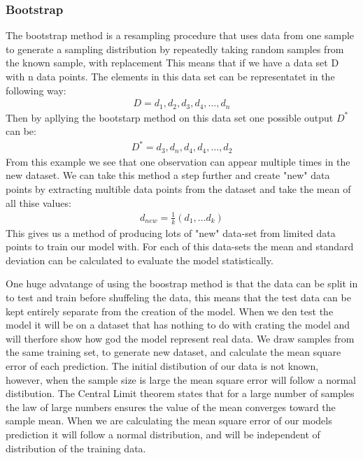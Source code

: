 \subsubsection{Bootstrap} 
\noindent The bootstrap method is a resampling procedure that uses data from one 
sample to generate a sampling distribution by repeatedly taking random 
samples from the known sample, with replacement %
This means that if we have a data set D with n data points.
The elements in this data set can be representatet in the following way:
\begin{align}
    D = {d_1, d_2, d_3, d_4, \dots, d_n}
\end{align}
Then by apllying the bootstarp method on this data set one possible output $D^{*}$ can be:
\begin{align}
    D^{*} = {d_3, d_n, d_4, d_4 , \dots, d_2}
\end{align}
From this example we see that one observation can appear multiple times in the new dataset.
We can take this method a step further and create "new" data points by extracting multible data points from 
the dataset and take the mean of all thise values:
\begin{align}
    d_{new} = \frac{1}{k}(d_1, \dots d_k)
\end{align}
This gives us a method of producing lots of "new" data-set from 
limited data points to train our model with. For each of this data-sets
the mean and standard deviation can be calculated to evaluate the model statistically. \cite{MLM}


One huge advatange of using the boostrap method is that the data can be split in to 
test and train before shuffeling the data, this means that the test data can be kept 
entirely separate from the creation of the model. When we den test the model it will
be on a dataset that has nothing to do with crating the model and will therfore show
how god the model represent real data. We draw samples from the same training set, to 
generate new dataset, and calculate the mean square error of each prediction. The initial 
distibution of our data is not known, however, when the sample size is large the mean 
square error will follow a normal distibution. The Central Limit theorem \cite{JAY2021CLT} states that for a 
large number of samples the law of large numbers \cite{JAY2021LLN} ensures the value of the mean converges toward the sample mean. 
When we are calculating the mean square error of our models prediction it will follow a 
normal distribution, and will be independent of distribution of the training data.



